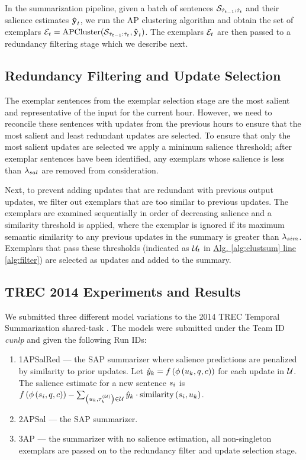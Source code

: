In the summarization pipeline, given a batch of sentences
$\mathcal{S}_{\hat{\tau}_{{t-1}}:\hat{\tau}_t}$ and their salience estimates
$\boldsymbol{\hat{\mathbf{y}}}_t$, we run the AP clustering algorithm and obtain the set of
exemplars $\mathcal{E}_t = \operatorname{APCluster}(\mathcal{S}_{\hat{\tau}_{{t-1}}:\hat{\tau}_t},
\boldsymbol{\hat{\mathbf{y}}}_t)$. The exemplars $\mathcal{E}_t$ are then passed to a redundancy
filtering stage which we describe next.

\subsection{\colorbox{blue!20!}{Redundancy Filtering and Update Selection}}
\label{sec:upsel}

The exemplar sentences from the exemplar selection stage are the most salient
and representative of the input for the current hour. However, we need to
reconcile these sentences with updates from the previous hours to ensure that
the most salient and least redundant  updates are selected. To ensure that only
the most salient updates are selected we apply a minimum salience threshold;
after exemplar sentences have been identified, any exemplars whose salience is
less than ${\lambda_{sal}}$ are removed from consideration. 

Next, to prevent adding updates that are redundant with previous output
updates, we filter out exemplars that are too similar to previous updates.  The
exemplars are examined sequentially in order of decreasing salience and  a
similarity threshold is applied, where the exemplar is ignored if its maximum
semantic similarity to any previous updates in the summary is greater than
${\lambda_{sim}}$.  Exemplars that pass these thresholds (indicated as
$\mathcal{U}_t$ in \hyperref[alg:clustsum]{Alg. \ref{alg:clustsum} line
\ref{alg:filter}}) are selected as updates and added to the summary.

\subsection{TREC 2014 Experiments and Results}



We submitted three different model variations to the 2014 TREC Temporal
Summarization shared-task \citep{aslam2015}. The models were submitted under
the Team ID \textit{cunlp} and given the following Run IDs:
\begin{enumerate}
\item 1APSalRed --- the SAP summarizer where salience predictions are penalized
by similarity to prior updates. Let $\hat{y}_k =
f\left(\phi\left(u_k,q,c\right)\right)$ for each update in
$\mathcal{U}$. The salience estimate for a new sentence $s_i$ is
$f\left(\phi\left(s_i,q,c\right)\right) - \sum_{\left(u_{k},\tau^{(\mathcal{U})}_{k}\right) \in
\mathcal{U}} \hat{y}_k \cdot \operatorname{similarity}\left(s_i,u_k\right)$. 
\item 2APSal --- the SAP summarizer.
\item 3AP --- the summarizer with no salience estimation, all non-singleton
 exemplars are passed on to the redundancy filter and update selection
stage.
\end{enumerate}

